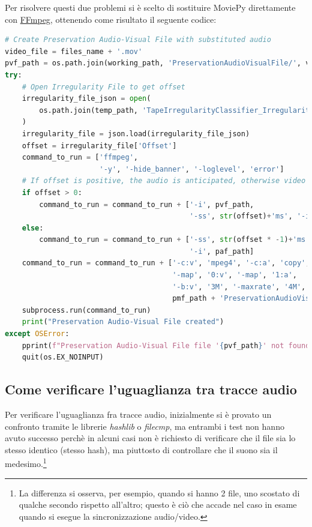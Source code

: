 Per risolvere questi due problemi si è scelto di sostituire MoviePy direttamente con \href{https://ffmpeg.org/}{FFmpeg}, ottenendo come risultato il seguente codice:
\begin{lstlisting}[language=Python, caption={Codice finale, creazione PreservationAudioVisualFile}]
# Create Preservation Audio-Visual File with substituted audio
video_file = files_name + '.mov'
pvf_path = os.path.join(working_path, 'PreservationAudioVisualFile/', video_file)
try:
    # Open Irregularity File to get offset
    irregularity_file_json = open(
        os.path.join(temp_path, 'TapeIrregularityClassifier_IrregularityFileOutput2.json')
    )
    irregularity_file = json.load(irregularity_file_json)
    offset = irregularity_file['Offset']
    command_to_run = ['ffmpeg',
                      '-y', '-hide_banner', '-loglevel', 'error']
    # If offset is positive, the audio is anticipated, otherwise video is anticipated (through seek)
    if offset > 0:
        command_to_run = command_to_run + ['-i', pvf_path,
                                           '-ss', str(offset)+'ms', '-i', paf_path]
    else:
        command_to_run = command_to_run + ['-ss', str(offset * -1)+'ms', '-i', pvf_path,
                                           '-i', paf_path]
    command_to_run = command_to_run + ['-c:v', 'mpeg4', '-c:a', 'copy',
                                       '-map', '0:v', '-map', '1:a',
                                       '-b:v', '3M', '-maxrate', '4M', '-bufsize', '4M',
                                       pmf_path + 'PreservationAudioVisualFile.mov']
    subprocess.run(command_to_run)
    print("Preservation Audio-Visual File created")
except OSError:
    pprint(f"Preservation Audio-Visual File file '{pvf_path}' not found!", color=Color.RED)
    quit(os.EX_NOINPUT)
\end{lstlisting}


\subsection{Come verificare l'uguaglianza tra tracce audio} \label{ssec:packager-audio}    %
Per verificare l'uguaglianza fra tracce audio, inizialmente si è provato un confronto tramite le librerie \textit{hashlib} o \textit{filecmp}, ma entrambi i test non hanno avuto successo perchè in alcuni casi non è richiesto di verificare che il file sia lo stesso identico (stesso hash), ma piuttosto di controllare che il suono sia il medesimo.\footnote{La differenza si osserva, per esempio, quando si hanno 2 file, uno scostato di qualche secondo rispetto all'altro; questo è ciò che accade nel caso in esame quando si esegue la sincronizzazione audio/video.}

